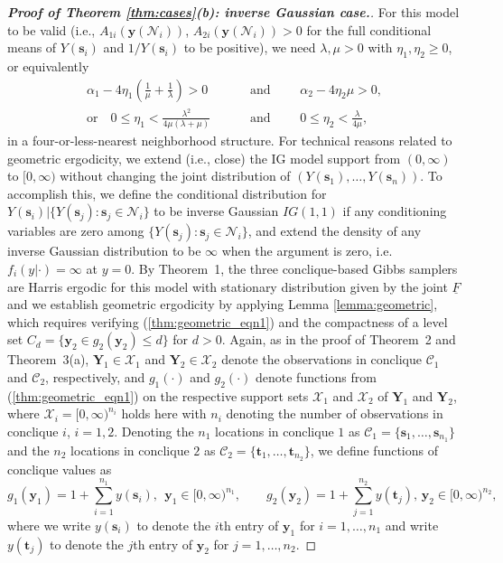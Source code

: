 \documentclass[12pt]{article}
\theoremstyle{definition}
\begin{document}
\begin{proof}[\bf Proof of Theorem \ref{thm:cases}(b): inverse Gaussian case.]
For this model to be valid (i.e., $A_{1i}(\boldsymbol y(\mathcal{N}_i))$, $A_{2i}(\boldsymbol y(\mathcal{N}_i)) > 0$ for the full conditional means of $Y(\boldsymbol s_i)$ and $1/Y(\boldsymbol s_i)$ to be positive), we need $\lambda, \mu > 0$ with $\eta_1, \eta_2 \ge 0$, or equivalently
\begin{align*}
\alpha_1 - 4\eta_1\left(\frac{1}{\mu} + \frac{1}{\lambda}\right) > 0 \qquad &\text{ and } \qquad \alpha_2 - 4\eta_2  \mu > 0, \\
\text{or} \quad 0 \le \eta_1 <\frac{\lambda^2}{4\mu(\lambda + \mu)} \qquad &\text{ and } \qquad 0 \le \eta_2 < \frac{\lambda}{4\mu},
\end{align*}
in a  four-or-less-nearest neighborhood structure.  For technical reasons related to geometric ergodicity, we extend (i.e., close) the IG model support from $(0, \infty)$ to $[0, \infty)$ without changing the joint distribution of $(Y(\boldsymbol s_1), \dots, Y(\boldsymbol s_n))$. To accomplish this, 
we define the conditional distribution for $Y(\boldsymbol s_i) | \{Y(\boldsymbol s_j): \boldsymbol s_j \in \mathcal{N}_i \}$ to be inverse Gaussian $IG(1,1)$ if any conditioning variables are zero among $\{Y(\boldsymbol s_j): \boldsymbol s_j \in \mathcal{N}_i \}$, and
 extend the density of any inverse Gaussian distribution to be $\infty$ when the argument is zero, i.e. $f_i(y|\cdot) = \infty$ at $y = 0$. 
  By Theorem~1,    the three conclique-based Gibbs samplers are  Harris ergodic  for this model with stationary distribution given by the joint $\underline{F}$ and we establish geometric ergodicity by applying Lemma \ref{lemma:geometric}, which requires verifying (\ref{thm:geometric_eqn1}) and the compactness of a level set $C_d = \{\boldsymbol y_2 \in g_{2}(\boldsymbol y_2) \le d\}$ for $d >0$.  Again, as in the proof of Theorem~2 and Theorem~3(a), $\boldsymbol Y_1 \in \mathcal{X}_1$ and $\boldsymbol Y_2 \in \mathcal{X}_2$ denote the observations in conclique $\mathcal{C}_1$ and $\mathcal{C}_2$, respectively, and $g_{1}(\cdot)$ and $g_{2}(\cdot)$ denote functions from  (\ref{thm:geometric_eqn1}) on the respective support sets $\mathcal{X}_1$ and $\mathcal{X}_2$ of $\boldsymbol Y_1$ and $\boldsymbol Y_2$,  where $\mathcal{X}_i = [0,\infty)^{n_i}$ holds here with $n_i$ denoting the number of observations in conclique $i$, $i = 1, 2$.
Denoting the $n_1$ locations in conclique $1$ as $\mathcal{C}_1 = \{\boldsymbol s_1, \dots, \boldsymbol  s_{n_1}\}$ and the $n_2$ locations in conclique $2$ as $\mathcal{C}_2 = \{\boldsymbol t_1  , \dots, \boldsymbol t_{n_2}\}$, we 
define functions of conclique values as
\[
g_{1}(\boldsymbol y_1) =
1+\sum_{i=1}^{n_1}  y(\boldsymbol s_i ),   \;\,\boldsymbol y_1 \in [0,\infty)^{n_1},  \qquad
  g_{2}(\boldsymbol y_2) = 1+ \sum_{j=1}^{n_2} y(\boldsymbol t_j), \,\boldsymbol y_2 \in  [0,\infty)^{n_2},  \]
  where we write $y(\boldsymbol s_i )$ to denote the $i$th entry of $\boldsymbol y_1$ for $i=1,\ldots,n_1$ and write $y(\boldsymbol t_j )$ to denote the $j$th entry of $\boldsymbol y_2$ for $j=1,\ldots,n_2$. 
  

\end{proof}
\end{document}

